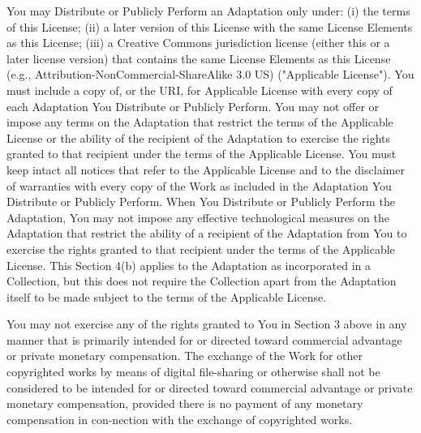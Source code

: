 \item
    You may Distribute or Publicly Perform an Adaptation only under: (i)
    the terms of this License; (ii) a later version of this License with
    the same License Elements as this License; (iii) a Creative Commons
    jurisdiction license (either this or a later license version) that
    contains the same License Elements as this License (e.g.,
    Attribution-NonCommercial-ShareAlike 3.0 US) ("Applicable License").
    You must include a copy of, or the URI, for Applicable License with
    every copy of each Adaptation You Distribute or Publicly Perform. You
    may not offer or impose any terms on the Adaptation that restrict the
    terms of the Applicable License or the ability of the recipient of the
    Adaptation to exercise the rights granted to that recipient under the
    terms of the Applicable License. You must keep intact all notices that
    refer to the Applicable License and to the disclaimer of warranties
    with every copy of the Work as included in the Adaptation You
    Distribute or Publicly Perform. When You Distribute or Publicly
    Perform the Adaptation, You may not impose any effective technological
    measures on the Adaptation that restrict the ability of a recipient of
    the Adaptation from You to exercise the rights granted to that
    recipient under the terms of the Applicable License. This Section 4(b)
    applies to the Adaptation as incorporated in a Collection, but this
    does not require the Collection apart from the Adaptation itself to be
    made subject to the terms of the Applicable License.

\item
    You may not exercise any of the rights granted to You in Section 3
    above in any manner that is primarily intended for or directed toward
    commercial advantage or private monetary compensation. The exchange of
    the Work for other copyrighted works by means of digital file-sharing
    or otherwise shall not be considered to be intended for or directed
    toward commercial advantage or private monetary compensation, provided
    there is no payment of any monetary compensation in con-nection with
    the exchange of copyrighted works.

